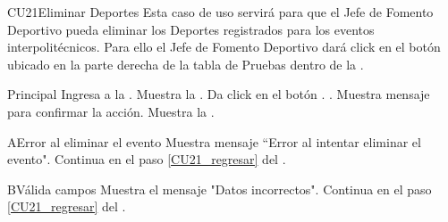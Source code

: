 \begin{UseCase}{CU21}{Eliminar Deportes}{
		\noindent Esta caso de uso servirá para que el Jefe de Fomento Deportivo pueda eliminar los Deportes registrados para los eventos interpolitécnicos.
		Para ello el Jefe de Fomento Deportivo dará click en el botón  ubicado en la  parte derecha de la tabla de Pruebas dentro de la .	
	} \label{CU21_evento}

		\end{UseCase}
	
    \begin{UCtrayectoria}{Principal}
    \UCpaso[\UCactor] Ingresa a la .
    \UCpaso Muestra la .
    \UCpaso[\UCactor] Da click en el botón . \label{CU21_regresar}.
    \UCpaso Muestra mensaje para confirmar la acción. 
    \UCpaso Muestra la .
    \end{UCtrayectoria}
    
    \begin{UCtrayectoriaA}{A}{Error al eliminar el evento}
    	\UCpaso Muestra mensaje “Error al intentar eliminar el evento".
    	\UCpaso Continua en el paso \ref{CU21_regresar} del .
    \end{UCtrayectoriaA}

	\begin{UCtrayectoriaA}{B}{Válida campos}
		\UCpaso Muestra el mensaje "Datos incorrectos".
   		\UCpaso Continua en el paso \ref{CU21_regresar} del .
	\end{UCtrayectoriaA}

	


